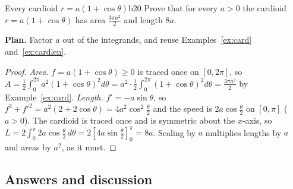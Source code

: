 \documentclass[11pt]{article}
\begin{document}
\begin{exmp}{Every cardioid $r=a(1+\cos\theta)$}{b20}
Prove that for every $a>0$ the cardioid $r=a(1+\cos\theta)$ has area $\frac{3\pi a^2}2$ and length $8a$.

\textbf{Plan.} Factor $a$ out of the integrands, and reuse Examples~\ref{ex:card} and~\ref{ex:cardlen}.

\begin{proof}
\emph{Area.} $f=a(1+\cos\theta)\ge0$ is traced once on $[0,2\pi]$, so $A=\frac12\int_0^{2\pi}a^2(1+\cos\theta)^2d\theta=a^2\cdot\frac12\int_0^{2\pi}(1+\cos\theta)^2d\theta=\frac{3\pi a^2}2$ by Example~\ref{ex:card}. \emph{Length.} $f'=-a\sin\theta$, so $f^2+f'^2=a^2\left(2+2\cos\theta\right)=4a^2\cos^2\frac\theta2$ and the speed is $2a\cos\frac\theta2$ on $[0,\pi]$ ($a>0$). The cardioid is traced once and is symmetric about the $x$-axis, so $L=2\int_0^\pi2a\cos\frac\theta2\,d\theta=2\left[4a\sin\frac\theta2\right]_0^\pi=8a$. Scaling by $a$ multiplies lengths by $a$ and areas by $a^2$, as it must.
\end{proof}
\end{exmp}

\subsection*{Answers and discussion}
\end{document}
